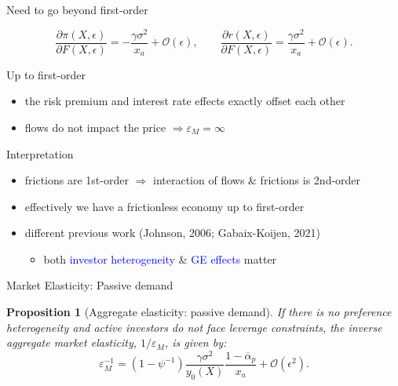 \documentclass[12pt,aspectratio=169]{beamer}
\newenvironment{wideitemize}{\itemize\addtolength{\itemsep}{10pt}}{\enditemize}
\providecommand{\propositionname}{Proposition}
\newcommand{\vspM}{\vspace{0.12truecm}}
\newtheorem{prop}{\protect\propositionname}
\providecommand{\propositionname}{Proposition}
\begin{document}
\begin{frame}{Need to go beyond first-order}
    \begin{small}
        \[\frac{\partial \pi(X,\epsilon)}{\partial F(X,\epsilon)} =-\frac{\gamma \sigma^2}{x_a}  +\mathcal{O}(\epsilon),
    	\qquad
    	\frac{\partial r(X,\epsilon)}{\partial F(X,\epsilon)} = \frac{\gamma \sigma^2}{x_a} +\mathcal{O}(\epsilon).\]
    \end{small}
    \vspace{-4mm}
    \begin{wideitemize}
        \item Up to first-order \vspM
        \begin{itemize}
            \item the risk premium and interest rate effects exactly offset each other\vspM
            \item flows do not impact the price $\Rightarrow \varepsilon_M=\infty$\vspM
        \end{itemize}
        \item Interpretation \vspM
        \begin{itemize}
            \item frictions are 1st-order $\Rightarrow$ interaction of flows \& frictions is 2nd-order\vspM
            \item effectively we have a frictionless economy up to first-order\vspM
            \item different previous work {\scriptsize(Johnson, 2006; Gabaix-Koijen, 2021)}\vspM
            \begin{itemize}\small
                \item both \textcolor{blue}{investor heterogeneity} \& \textcolor{blue}{GE effects} matter
            \end{itemize}
        \end{itemize}
    \end{wideitemize}
\end{frame}

\begin{frame}{Market Elasticity: Passive demand}
    \begin{prop}[Aggregate elasticity: passive demand]\label{prop:elasticity_passive_demand}
    	If there is no preference heterogeneity and active investors do not face leverage constraints, the inverse aggregate market elasticity, $ 1/\varepsilon_M $, is given by:
    	\begin{equation*}
    		\varepsilon_{M}^{-1}=%
    		\left(1-\psi^{-1}\right) \frac{\gamma \sigma^{2}}{y_{0}(X)} \frac{1-\overline{\alpha}_{p}}{x_{a}}+\mathcal{O}\left(\epsilon^{2}\right).
    	\end{equation*}		
    \end{prop}
\end{frame}
\end{document}
